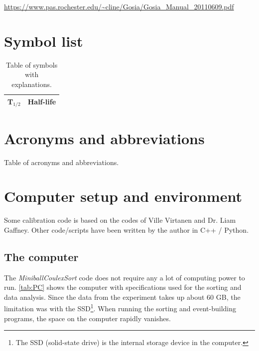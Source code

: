 \documentclass[twoside,english]{uiofysmaster/uiofysmaster}
\begin{document}
\url{https://www.pas.rochester.edu/~cline/Gosia/Gosia_Manual_20110609.pdf}






\begin{appendices}

\chapter{Symbol list}

\begin{table}[h]
  \centering
  \caption{Table of symbols with explanations.}
    \begin{tabular}{ll}
        \hline
        T$_{1/2}$ & Half-life \\
        \hline
    \end{tabular}
    \label{tab:symbols}
\end{table}


\chapter{Acronyms and abbreviations}

\begin{table}[ht] 
	\centering 
	\caption{Table of acronyms and abbreviations.}
	
\end{table}


\chapter{Computer setup and environment}
Some calibration code is based on the codes of Ville Virtanen and Dr. Liam Gaffney. Other code/scripts have been written by the author in C++ / Python.

\section{The computer}
The \textsl{MiniballCoulexSort} code does not require any a lot of computing power to run. \autoref{tab:PC} shows the computer with specifications used for the sorting and data analysis. Since the data from the experiment takes up about 60 GB, the limitation was with the SSD\footnote{The SSD (solid-state drive) is the internal storage device in the computer.}. When running the sorting and event-building programs, the space on the computer rapidly vanishes. 


\end{appendices}
\end{document}
